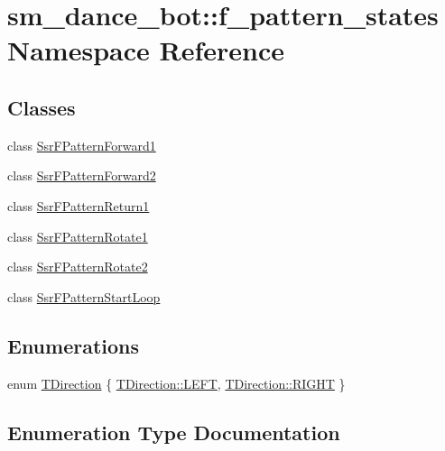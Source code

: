 \hypertarget{namespacesm__dance__bot_1_1f__pattern__states}{}\section{sm\+\_\+dance\+\_\+bot\+:\+:f\+\_\+pattern\+\_\+states Namespace Reference}
\label{namespacesm__dance__bot_1_1f__pattern__states}
\subsection*{Classes}
\begin{DoxyCompactItemize}
\item 
class \hyperlink{structsm__dance__bot_1_1f__pattern__states_1_1SsrFPatternForward1}{Ssr\+F\+Pattern\+Forward1}
\item 
class \hyperlink{structsm__dance__bot_1_1f__pattern__states_1_1SsrFPatternForward2}{Ssr\+F\+Pattern\+Forward2}
\item 
class \hyperlink{structsm__dance__bot_1_1f__pattern__states_1_1SsrFPatternReturn1}{Ssr\+F\+Pattern\+Return1}
\item 
class \hyperlink{structsm__dance__bot_1_1f__pattern__states_1_1SsrFPatternRotate1}{Ssr\+F\+Pattern\+Rotate1}
\item 
class \hyperlink{structsm__dance__bot_1_1f__pattern__states_1_1SsrFPatternRotate2}{Ssr\+F\+Pattern\+Rotate2}
\item 
class \hyperlink{structsm__dance__bot_1_1f__pattern__states_1_1SsrFPatternStartLoop}{Ssr\+F\+Pattern\+Start\+Loop}
\end{DoxyCompactItemize}
\subsection*{Enumerations}
\begin{DoxyCompactItemize}
\item 
enum \hyperlink{namespacesm__dance__bot_1_1f__pattern__states_acc99b72745466e5dcee9272425a34e58}{T\+Direction} \{ \hyperlink{namespacesm__dance__bot_1_1f__pattern__states_acc99b72745466e5dcee9272425a34e58a684d325a7303f52e64011467ff5c5758}{T\+Direction\+::\+L\+E\+FT}, 
\hyperlink{namespacesm__dance__bot_1_1f__pattern__states_acc99b72745466e5dcee9272425a34e58a21507b40c80068eda19865706fdc2403}{T\+Direction\+::\+R\+I\+G\+HT}
 \}
\end{DoxyCompactItemize}


\subsection{Enumeration Type Documentation}
